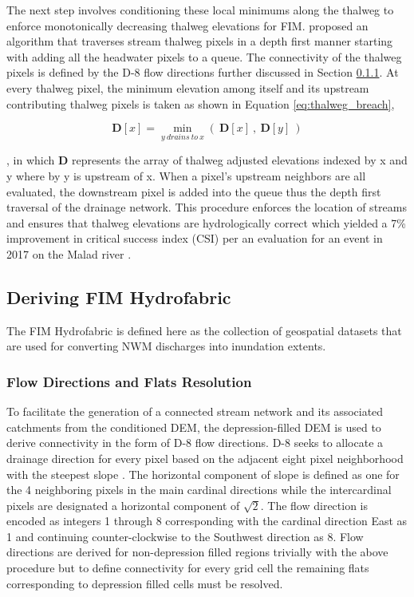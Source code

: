 The next step involves conditioning these local minimums along the thalweg to enforce monotonically decreasing thalweg elevations for FIM.
 proposed an algorithm that traverses stream thalweg pixels in a depth first manner starting with adding all the headwater pixels to a queue. 
The connectivity of the thalweg pixels is defined by the D-8 flow directions further discussed in Section \ref{ssec:flow_direction_and_flat_resolution}.
At every thalweg pixel, the minimum elevation among itself and its upstream contributing thalweg pixels is taken as shown in Equation \ref{eq:thalweg_breach},
%
\begin{linenomath*}
\begin{equation}
\label{eq:thalweg_breach}
\textbf{D}[x] = \min_{y\ drains\ to\ x} {(\ \textbf{D}[x]\ ,\ \textbf{D}[y]\ )}
\end{equation}
\end{linenomath*}
%
, in which \textbf{D} represents the array of thalweg adjusted elevations indexed by x and y where by y is upstream of x. 
When a pixel's upstream neighbors are all evaluated, the downstream pixel is added into the queue thus the depth first traversal of the drainage network.
This procedure enforces the location of streams and ensures that thalweg elevations are hydrologically correct which yielded a 7\% improvement in critical success index (CSI) per an evaluation for an event in 2017 on the Malad river \cite{garousi2019terrain}.
%
\subsection{Deriving FIM Hydrofabric}
\label{ssec:deriving_fim_hydrofabric}
%
The FIM Hydrofabric is defined here as the collection of geospatial datasets that are used for converting NWM discharges into inundation extents.
%
\subsubsection{Flow Directions and Flats Resolution}
\label{ssec:flow_direction_and_flat_resolution}
%
To facilitate the generation of a connected stream network and its associated catchments from the conditioned DEM, the depression-filled DEM is used to derive connectivity in the form of D-8 flow directions.
D-8 seeks to allocate a drainage direction for every pixel based on the adjacent eight pixel neighborhood with the steepest slope \cite{o1984extraction}.
The horizontal component of slope is defined as one for the 4 neighboring pixels in the main cardinal directions while the intercardinal pixels are designated a horizontal component of $\sqrt{2}$. 
The flow direction is encoded as integers 1 through 8 corresponding with the cardinal direction East as 1 and continuing counter-clockwise to the Southwest direction as 8. 
Flow directions are derived for non-depression filled regions trivially with the above procedure but to define connectivity for every grid cell the remaining flats corresponding to depression filled cells must be resolved.

